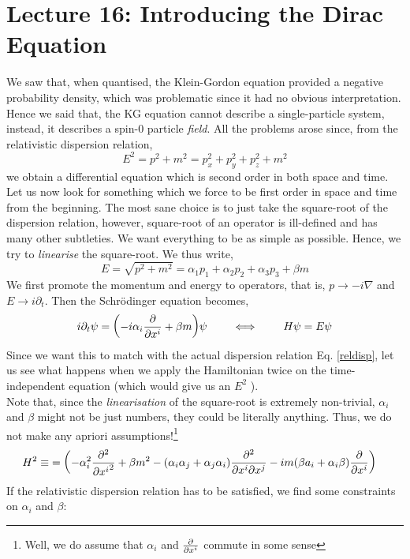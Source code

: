 \section*{Lecture 16: Introducing the Dirac Equation}
We saw that, when quantised, the Klein-Gordon equation provided a negative probability density, which was problematic since it had no obvious interpretation. Hence we said that, the KG equation cannot describe a single-particle system, instead, it describes a spin-0 particle \textit{field}. All the problems arose since, from the relativistic dispersion relation, \begin{equation}\label{reldisp}
    E^2=p^2+m^2 = p_x^2+p_y^2+p_z^2+m^2
\end{equation} we obtain a differential equation which is second order in both space and time. \\[0.2cm]
Let us now look for something which we force to be first order in space and time from the beginning. The most sane choice is to just take the square-root of the dispersion relation, however, square-root of an operator is ill-defined and has many other subtleties. We want everything to be as simple as possible. Hence, we try to \textit{linearise} the square-root. We thus write,
$$E = \sqrt{p^2+m^2} = \alpha_1 p_1 + \alpha_2 p_2+\alpha_3 p_3 + \beta m$$
We first promote the momentum and energy to operators, that is, $p\to -i \nabla$ and $E\to i \partial_t $. Then the Schr\"odinger equation becomes, 
$$i \partial_t \psi = \qty(-i\alpha_i  \pdv{x^i} + \beta m)\psi \qquad \iff \qquad H\psi = E\psi$$ Since we want this to match with the actual dispersion relation Eq. \ref{reldisp}, let us see what happens when we apply the Hamiltonian twice on the time-independent equation  (which would give us an $E^2$ ).\\[0.2cm]
Note that, since the \textit{linearisation} of the square-root is extremely non-trivial, $\alpha_i$ and $\beta$ might not be just numbers, they could be literally anything. Thus, we do not make any apriori assumptions!\footnote{Well, we do assume that $\alpha_i$ and $\pdv{x^i}$ commute in some sense}
\begin{align*}
    H^2 \equiv &= \qty(-\alpha_i^2 \pdv[2]{{x^i}}+\beta m^2 - (\alpha_i \alpha_j + \alpha_j \alpha_i)\frac{\partial^2}{\partial {x^i} \partial {x^j}} - im (\beta a_i + \alpha_i \beta)\pdv{x^i})
\end{align*}
If the relativistic dispersion relation has to be satisfied, we find some constraints on $\alpha_i$ and $\beta$:
